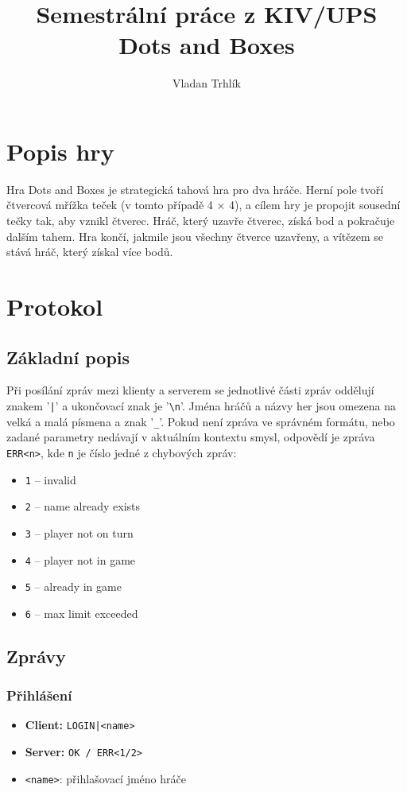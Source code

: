\documentclass[11pt,a4paper]{article}
\author{Vladan Trhlík}
\title{%
	Semestrální práce z KIV/UPS \\
	\large Dots and Boxes  \\
}
\begin{document}
\maketitle

\section{Popis hry}
Hra Dots and Boxes je strategická tahová hra pro dva hráče. Herní pole tvoří čtvercová mřížka teček (v tomto případě 4 × 4), a cílem hry je propojit sousední tečky tak, aby vznikl čtverec. Hráč, který uzavře čtverec, získá bod a pokračuje dalším tahem. Hra končí, jakmile jsou všechny čtverce uzavřeny, a vítězem se stává hráč, který získal více bodů.
\section{Protokol}

\subsection{Základní popis}
Při posílání zpráv mezi klienty a serverem se jednotlivé části zpráv oddělují znakem '\texttt{|}' a ukončovací znak je '\texttt{\textbackslash n}'. Jména hráčů a názvy her jsou omezena na velká a malá písmena a znak '\texttt{\_}'. Pokud není zpráva ve správném formátu, nebo zadané parametry nedávají v aktuálním kontextu smysl, odpovědí je zpráva \texttt{ERR<n>}, kde \texttt{n} je číslo jedné z chybových zpráv:
\begin{itemize}
	\item \texttt{1} -- invalid
	\item \texttt{2} -- name already exists
	\item \texttt{3} -- player not on turn
	\item \texttt{4} -- player not in game
	\item \texttt{5} -- already in game
	\item \texttt{6} -- max limit exceeded
\end{itemize}

\subsection{Zprávy}
\subsubsection*{Přihlášení}
\begin{itemize}
	\item \textbf{Client:} \texttt{LOGIN|<name>}
	\item \textbf{Server:} \texttt{OK / ERR<1/2>}
	\item \texttt{<name>}: přihlašovací jméno hráče
\end{itemize}
\end{document}
